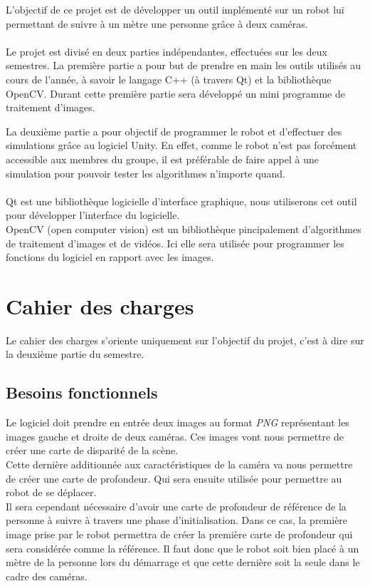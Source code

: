\documentclass[12pt,a4paper]{report}
\begin{document}
L'objectif de ce projet est de développer un outil implémenté sur un robot lui permettant de suivre à un mètre une personne grâce à deux caméras.\\\\

Le projet est divisé en deux parties indépendantes, effectuées sur les deux semestres. 
La première partie a pour but de prendre en main les outils utilisés au cours de l'année, à savoir le langage C++ (à travers Qt) et la bibliothèque OpenCV.
Durant cette première partie sera développé un mini programme de traitement d'images. 

La deuxième partie a pour objectif de programmer le robot et d'effectuer des simulations grâce au logiciel Unity. En effet, comme le robot n'est pas forcément accessible aux membres du groupe, il est préférable de faire appel à une simulation pour pouvoir tester les algorithmes n'importe quand.\\\\

Qt est une bibliothèque logicielle d'interface graphique, nous utiliserons cet outil pour développer l'interface du logicielle.\\

OpenCV (open computer vision) est un bibliothèque pincipalement d'algorithmes de traitement d'images et de vidéos. Ici elle sera utilisée pour programmer les fonctions du logiciel en rapport avec les images.\\


\section{Cahier des charges}
Le cahier des charges s'oriente uniquement sur l'objectif du projet, c'est à dire sur la deuxième partie du semestre.
\subsection{Besoins fonctionnels}
	Le logiciel doit prendre en entrée deux images au format \textit{PNG} représentant les images gauche et droite de deux caméras.
	Ces images vont nous permettre de créer une carte de disparité de la scène.\\	
	Cette dernière additionnée aux caractéristiques de la caméra va nous permettre de créer une carte de profondeur. Qui sera ensuite utilisée pour permettre au robot de se déplacer.\\
	Il sera cependant nécessaire d'avoir une carte de profondeur de référence de la personne à suivre à travers une phase d'initialisation. Dans ce cas, la première image prise par le robot permettra de créer la première carte de profondeur qui sera considérée comme la référence. Il faut donc que le robot soit bien placé à un mètre de la personne lors du démarrage et que cette dernière soit la seule dans le cadre des caméras.
\end{document}
